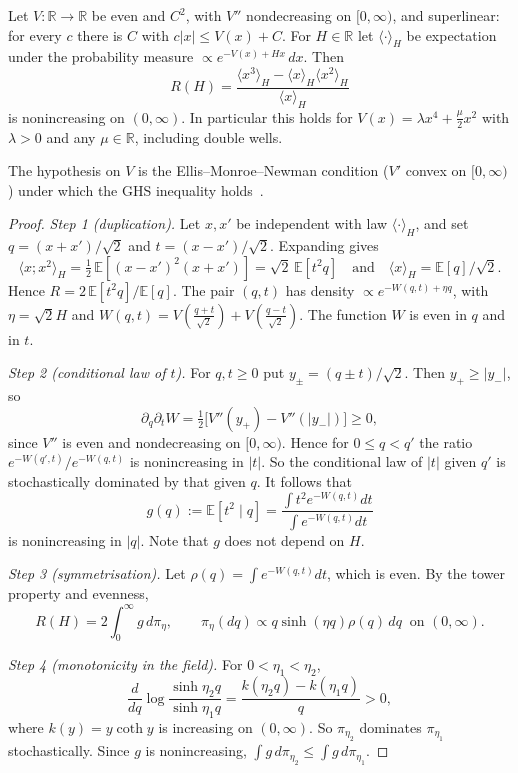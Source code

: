 \begin{theorem}\label{thm:onesite}
Let $V\colon\mathbb R\to\mathbb R$ be even and $C^2$, with $V''$ nondecreasing on $[0,\infty)$, and superlinear: for every $c$ there is $C$ with $c|x|\le V(x)+C$. For $H\in\mathbb R$ let $\langle\cdot\rangle_H$ be expectation under the probability measure $\propto e^{-V(x)+Hx}\,dx$. Then
\[
R(H)=\frac{\langle x^3\rangle_H-\langle x\rangle_H\langle x^2\rangle_H}{\langle x\rangle_H}
\]
is nonincreasing on $(0,\infty)$. In particular this holds for $V(x)=\lambda x^4+\tfrac\mu2x^2$ with $\lambda>0$ and any $\mu\in\mathbb R$, including double wells.
\end{theorem}

The hypothesis on $V$ is the Ellis--Monroe--Newman condition ($V'$ convex on $[0,\infty)$) under which the GHS inequality holds~\cite{EMN76}.

\begin{proof}
\emph{Step 1 (duplication).} Let $x,x'$ be independent with law $\langle\cdot\rangle_H$, and set $q=(x+x')/\sqrt2$ and $t=(x-x')/\sqrt2$. Expanding gives
\[
\langle x;x^2\rangle_H=\tfrac12\,\mathbb E[(x-x')^2(x+x')]=\sqrt2\,\mathbb E[t^2q]
\quad\text{and}\quad
\langle x\rangle_H=\mathbb E[q]/\sqrt2 .
\]
Hence $R=2\,\mathbb E[t^2q]/\mathbb E[q]$. The pair $(q,t)$ has density $\propto e^{-W(q,t)+\eta q}$, with $\eta=\sqrt2H$ and $W(q,t)=V(\tfrac{q+t}{\sqrt2})+V(\tfrac{q-t}{\sqrt2})$. The function $W$ is even in $q$ and in $t$.

\emph{Step 2 (conditional law of $t$).} For $q,t\ge0$ put $y_\pm=(q\pm t)/\sqrt2$. Then $y_+\ge|y_-|$, so
\[
\partial_q\partial_tW=\tfrac12\big[V''(y_+)-V''(|y_-|)\big]\ge0 ,
\]
since $V''$ is even and nondecreasing on $[0,\infty)$. Hence for $0\le q<q'$ the ratio $e^{-W(q',t)}/e^{-W(q,t)}$ is nonincreasing in $|t|$. So the conditional law of $|t|$ given $q'$ is stochastically dominated by that given $q$. It follows that
\[
g(q):=\mathbb E[t^2\mid q]=\frac{\int t^2e^{-W(q,t)}dt}{\int e^{-W(q,t)}dt}
\]
is nonincreasing in $|q|$. Note that $g$ does not depend on $H$.

\emph{Step 3 (symmetrisation).} Let $\rho(q)=\int e^{-W(q,t)}dt$, which is even. By the tower property and evenness,
\[
R(H)=2\int_0^\infty g\,d\pi_\eta,\qquad \pi_\eta(dq)\propto q\sinh(\eta q)\rho(q)\,dq\ \text{ on }(0,\infty).
\]

\emph{Step 4 (monotonicity in the field).} For $0<\eta_1<\eta_2$,
\[
\frac{d}{dq}\log\frac{\sinh\eta_2q}{\sinh\eta_1q}=\frac{k(\eta_2q)-k(\eta_1q)}{q}>0,
\]
where $k(y)=y\coth y$ is increasing on $(0,\infty)$. So $\pi_{\eta_2}$ dominates $\pi_{\eta_1}$ stochastically. Since $g$ is nonincreasing, $\int g\,d\pi_{\eta_2}\le\int g\,d\pi_{\eta_1}$. \qedhere
\end{proof}

